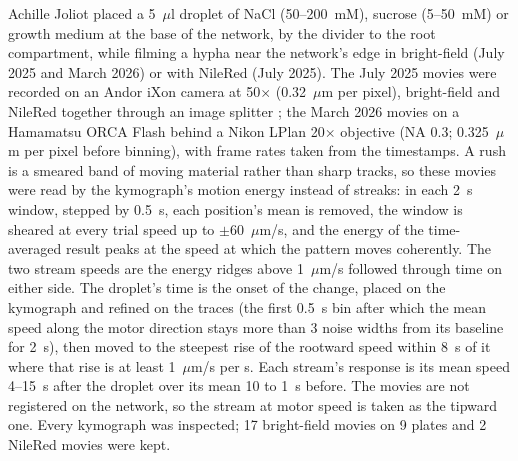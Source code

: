 Achille Joliot placed a 5~$\mu$l droplet  of NaCl (50--200~mM), sucrose (5--50~mM) or growth medium at the base of the network, by the divider to the root compartment, while filming a hypha near the network's edge in bright-field (July 2025 and March 2026) or with NileRed (July 2025).
The July 2025 movies were recorded on an Andor iXon camera at 50$\times$ (0.32~$\mu$m per pixel), bright-field and NileRed together through an image splitter ; the March 2026 movies on a Hamamatsu ORCA Flash behind a Nikon LPlan 20$\times$ objective (NA 0.3; 0.325~$\mu$m per pixel before binning), with frame rates taken from the timestamps.
A rush is a smeared band of moving material rather than sharp tracks, so these movies were read by the kymograph's motion energy instead of streaks: in each 2~s window, stepped by 0.5~s, each position's mean is removed, the window is sheared at every trial speed up to $\pm$60~$\mu$m/s, and the energy of the time-averaged result peaks at the speed at which the pattern moves coherently.
The two stream speeds are the energy ridges above 1~$\mu$m/s followed through time on either side.
The droplet's time is the onset of the change, placed on the kymograph and refined on the traces (the first 0.5~s bin after which the mean speed along the motor direction stays more than 3 noise widths from its baseline for 2~s), then moved to the steepest rise of the rootward speed within 8~s of it where that rise is at least 1~$\mu$m/s per s.
Each stream's response is its mean speed 4--15~s after the droplet over its mean 10 to 1~s before.
The movies are not registered on the network, so the stream at motor speed is taken as the tipward one.
Every kymograph was inspected; 17 bright-field movies on 9 plates and 2 NileRed movies were kept.

